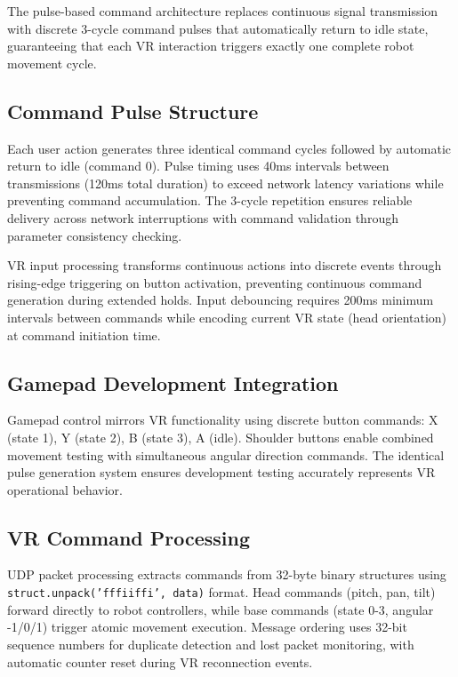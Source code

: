 The pulse-based command architecture replaces continuous signal transmission with discrete 3-cycle command pulses that automatically return to idle state, guaranteeing that each VR interaction triggers exactly one complete robot movement cycle.

\subsection{Command Pulse Structure}

Each user action generates three identical command cycles followed by automatic return to idle (command 0). Pulse timing uses 40ms intervals between transmissions (120ms total duration) to exceed network latency variations while preventing command accumulation. The 3-cycle repetition ensures reliable delivery across network interruptions with command validation through parameter consistency checking.

VR input processing transforms continuous actions into discrete events through rising-edge triggering on button activation, preventing continuous command generation during extended holds. Input debouncing requires 200ms minimum intervals between commands while encoding current VR state (head orientation) at command initiation time.

\subsection{Gamepad Development Integration}

Gamepad control mirrors VR functionality using discrete button commands: X (state 1), Y (state 2), B (state 3), A (idle). Shoulder buttons enable combined movement testing with simultaneous angular direction commands. The identical pulse generation system ensures development testing accurately represents VR operational behavior.

\subsection{VR Command Processing}

UDP packet processing extracts commands from 32-byte binary structures using \texttt{struct.unpack('fffiiffi', data)} format. Head commands (pitch, pan, tilt) forward directly to robot controllers, while base commands (state 0-3, angular -1/0/1) trigger atomic movement execution. Message ordering uses 32-bit sequence numbers for duplicate detection and lost packet monitoring, with automatic counter reset during VR reconnection events.

